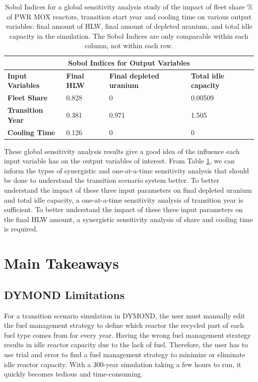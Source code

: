     \begin{table}[H]
        \centering
        \doublespacing
        \caption{Sobol Indices for a global sensitivity analysis study of the impact of 
        fleet share \% of PWR MOX reactors, transition start year and cooling time on various output
        variables: final amount of HLW, final amount of depleted uranium, and total 
        idle capacity in the simulation. The Sobol Indices are only comparable within each column, 
        not within each row.}
        \label{tab:sobol}
            \small
            \begin{tabular}{l|lll}
                \hline	
                \multicolumn{4}{c}{\textbf{Sobol Indices for Output Variables}}   \\ \hline
                \textbf{Input Variables} & \textbf{Final HLW} & \textbf{Final depleted uranium} & \textbf{Total idle capacity} \\ \hline
                \textbf{Fleet Share} & 0.828     & 0                      & 0.00509             \\
                \textbf{Transition Year}                & 0.381     & 0.971                  & 1.505               \\
                \textbf{Cooling Time}                         & 0.126     & 0                      & 0                   \\ \hline

            \end{tabular}
    \end{table}

These global sensitivity analysis results give a good idea of the influence each 
input variable has on the output variables of interest. 
From Table \ref{tab:sobol}, we can inform the types of synergistic and one-at-a-time 
sensitivity analysis that should be done 
to understand the transition scenario system better. 
To better understand the impact of these three input parameters on final depleted 
uranium and total idle capacity, a one-at-a-time sensitivity analysis of transition 
year is sufficient. 
To better understand the impact of these three input parameters on the final HLW 
amount, a synergistic sensitivity analysis of share and cooling time is required.

\section{Main Takeaways}
\subsection{DYMOND Limitations}
For a transition scenario simulation in DYMOND, the user must 
manually edit the fuel management 
strategy to define which reactor the recycled 
part of each fuel type comes from for every year. 
Having the wrong fuel management strategy results in idle reactor
capacity due to the lack of fuel. 
Therefore, the user has to use trial and error to find a fuel 
management strategy to minimize or eliminate idle reactor capacity. 
With a 300-year simulation taking a few hours to run, it quickly 
becomes tedious and time-consuming.  


